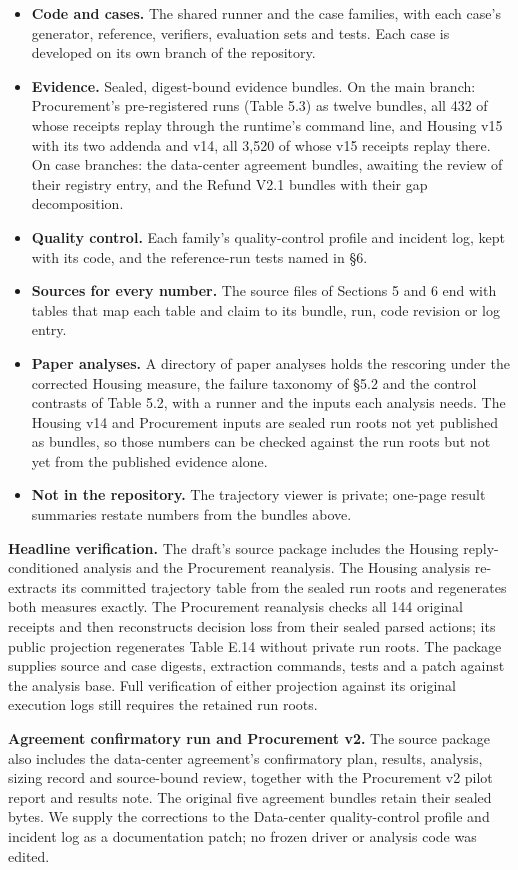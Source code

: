 \begin{itemize}
\tightlist
\item
  \textbf{Code and cases.} The shared runner and the case families, with each case's generator, reference, verifiers,
  evaluation sets and tests. Each case is developed on its own branch of the repository.
\item
  \textbf{Evidence.} Sealed, digest-bound evidence bundles. On the main branch: Procurement's pre-registered runs (Table
  5.3) as twelve bundles, all 432 of whose receipts replay through the runtime's command line, and Housing v15 with
  its two addenda and v14, all 3,520 of whose v15 receipts replay there. On case branches: the data-center agreement
  bundles, awaiting the review of their registry entry, and the Refund V2.1 bundles with their gap decomposition.
\item
  \textbf{Quality control.} Each family's quality-control profile and incident log, kept with its code, and the
  reference-run tests named in §6.
\item
  \textbf{Sources for every number.} The source files of Sections 5 and 6 end with tables that map each table and claim to
  its bundle, run, code revision or log entry.
\item
  \textbf{Paper analyses.} A directory of paper analyses holds the rescoring under the corrected Housing measure, the
  failure taxonomy of §5.2 and the control contrasts of Table 5.2, with a runner and the inputs each analysis needs.
  The Housing v14 and Procurement inputs are sealed run roots not yet published as bundles, so those numbers can be
  checked against the run roots but not yet from the published evidence alone.
\item
  \textbf{Not in the repository.} The trajectory viewer is private; one-page result summaries restate numbers from the
  bundles above.
\end{itemize}

\textbf{Headline verification.} The draft's source package includes the Housing reply-conditioned analysis and the
Procurement reanalysis. The Housing analysis re-extracts its committed trajectory table from the sealed run roots and
regenerates both measures exactly. The Procurement reanalysis checks all 144 original receipts and then reconstructs
decision loss from their sealed parsed actions; its public projection regenerates Table E.14 without private run
roots. The package supplies source and case digests, extraction commands, tests and a patch against the analysis base.
Full verification of either projection against its original execution logs still requires the retained run roots.

\textbf{Agreement confirmatory run and Procurement v2.} The source package also includes the data-center agreement's
confirmatory plan, results, analysis, sizing record and source-bound review, together with the Procurement v2 pilot
report and results note. The original five agreement bundles retain their sealed bytes. We supply the corrections to
the Data-center quality-control profile and incident log as a documentation patch; no frozen driver or analysis code
was edited.
